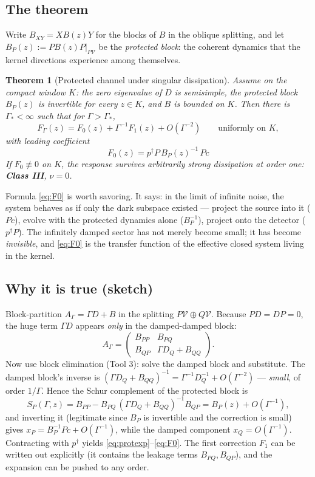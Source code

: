 \documentclass[11pt]{article}
\newtheorem{theorem}{Theorem}
\begin{document}
\subsection{The theorem}

Write $B_{XY}=XB(z)Y$ for the blocks of $B$ in the oblique splitting, and let
$B_P(z):=PB(z)P|_{P\mathcal V}$ be the \emph{protected block}: the coherent
dynamics that the kernel directions experience among themselves.

\begin{theorem}[Protected channel under singular dissipation]
\label{thm:three}
Assume on the compact window $K$: the zero eigenvalue of $D$ is semisimple,
the protected block $B_P(z)$ is invertible for every $z\in K$, and $B$ is
bounded on $K$.  Then there is $\Gamma_*<\infty$ such that for $\Gamma>\Gamma_*$,
\begin{equation}
F_\Gamma(z)=F_0(z)+\Gamma^{-1}F_1(z)+O(\Gamma^{-2})
\qquad\text{uniformly on }K,
\label{eq:protexp}
\end{equation}
with leading coefficient
\begin{equation}
\boxed{\;F_0(z)=p^\dagger P\, B_P(z)^{-1}\, P c\;}
\label{eq:F0}
\end{equation}
If $F_0\not\equiv0$ on $K$, the response survives arbitrarily strong
dissipation at order one: \textbf{Class III}, $\nu=0$.
\end{theorem}

Formula \eqref{eq:F0} is worth savoring.  It says: in the limit of infinite
noise, the system behaves as if only the dark subspace existed --- project
the source into it ($Pc$), evolve with the protected dynamics alone
($B_P^{-1}$), project onto the detector ($p^\dagger P$).  The infinitely
damped sector has not merely become small; it has become \emph{invisible},
and \eqref{eq:F0} is the transfer function of the effective closed system
living in the kernel.

\subsection{Why it is true (sketch)}

Block-partition $A_\Gamma=\Gamma D+B$ in the splitting
$P\mathcal V\oplus Q\mathcal V$.  Because $PD=DP=0$, the huge term
$\Gamma D$ appears \emph{only} in the damped-damped block:
\[
A_\Gamma=\begin{pmatrix}
B_{PP} & B_{PQ}\\
B_{QP} & \Gamma D_Q+B_{QQ}
\end{pmatrix}.
\]
Now use block elimination (Tool 3): solve the damped block and substitute.
The damped block's inverse is
$(\Gamma D_Q+B_{QQ})^{-1}=\Gamma^{-1}D_Q^{-1}+O(\Gamma^{-2})$ --- \emph{small},
of order $1/\Gamma$.  Hence the Schur complement of the protected block is
\[
S_P(\Gamma,z)=B_{PP}-B_{PQ}\,(\Gamma D_Q+B_{QQ})^{-1}B_{QP}
= B_P(z)+O(\Gamma^{-1}),
\]
and inverting it (legitimate since $B_P$ is invertible and the correction is
small) gives $x_P = B_P^{-1}Pc + O(\Gamma^{-1})$, while the damped component
$x_Q=O(\Gamma^{-1})$.  Contracting with $p^\dagger$ yields
\eqref{eq:protexp}--\eqref{eq:F0}.  The first correction $F_1$ can be written
out explicitly (it contains the leakage terms $B_{PQ},B_{QP}$), and the
expansion can be pushed to any order.
\end{document}

